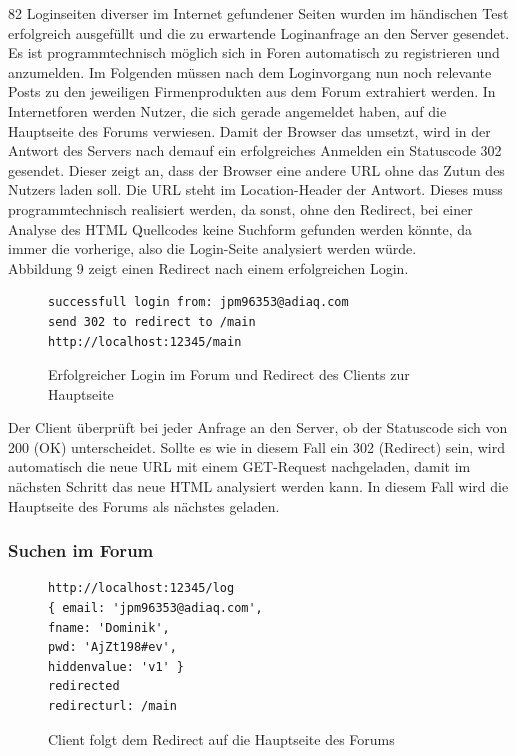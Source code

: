 82 Loginseiten diverser im Internet gefundener Seiten wurden im händischen Test erfolgreich ausgefüllt und die zu erwartende Loginanfrage an den Server gesendet.\\
Es ist programmtechnisch möglich sich in Foren automatisch zu registrieren und anzumelden. Im Folgenden müssen nach dem Loginvorgang nun noch relevante Posts zu den jeweiligen Firmenprodukten aus dem Forum extrahiert werden.\newline
In Internetforen werden Nutzer, die sich gerade angemeldet haben, auf die Hauptseite des Forums verwiesen. Damit der Browser das umsetzt, wird in der Antwort des Servers nach demauf ein erfolgreiches Anmelden ein Statuscode 302 gesendet. Dieser zeigt an, dass der Browser eine andere URL ohne das Zutun des Nutzers laden soll. Die URL steht im Location-Header der Antwort. Dieses muss programmtechnisch realisiert werden, da sonst, ohne den Redirect, bei einer Analyse des HTML Quellcodes keine Suchform gefunden werden könnte, da immer die vorherige, also die Login-Seite analysiert werden würde.\\
Abbildung 9 zeigt einen Redirect nach einem erfolgreichen Login.

\begin{figure}[ht]
\begin{lstlisting}[language=HTML5]
successfull login from: jpm96353@adiaq.com
send 302 to redirect to /main
http://localhost:12345/main
\end{lstlisting}
\caption{Erfolgreicher Login im Forum und Redirect des Clients zur Hauptseite}
\end{figure}

Der Client überprüft bei jeder Anfrage an den Server, ob der Statuscode sich von 200 (OK) unterscheidet. Sollte es wie in diesem Fall ein 302 (Redirect) sein, wird automatisch die neue URL mit einem GET-Request nachgeladen, damit im nächsten Schritt das neue HTML analysiert werden kann. In diesem Fall wird die Hauptseite des Forums als nächstes geladen.

\subsubsection{Suchen im Forum}

\begin{figure}[ht]
\begin{lstlisting}[language=HTML5]
http://localhost:12345/log
{ email: 'jpm96353@adiaq.com',
fname: 'Dominik',
pwd: 'AjZt198#ev',
hiddenvalue: 'v1' }
redirected
redirecturl: /main
\end{lstlisting}
\caption{Client folgt dem Redirect auf die Hauptseite des Forums}
\end{figure}

